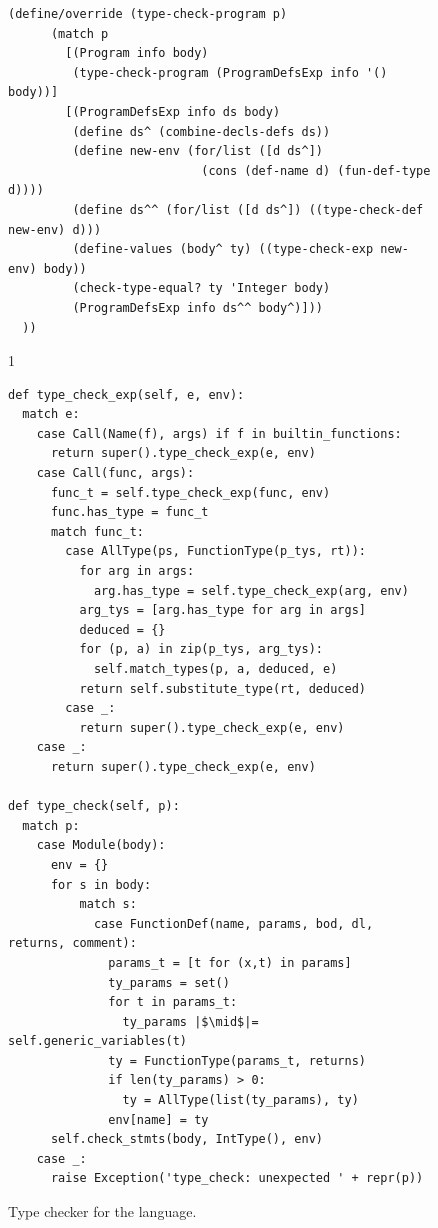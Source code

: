 \documentclass[7x10]{TimesAPriori_MIT}%
\def\pythonEd{1}
\providecommand{\BookEdition}{1}
\let\edition\BookEdition
\newcommand{\pythonColor}[0]{}
\numberwithin{theorem}{chapter}
\numberwithin{definition}{chapter}
\numberwithin{equation}{chapter}
\begin{document}
\begin{figure}[tbp]
\begin{tcolorbox}[colback=white]
{\begin{lstlisting}[basicstyle=\ttfamily\scriptsize]
    (define/override (type-check-program p)
      (match p
        [(Program info body)
         (type-check-program (ProgramDefsExp info '() body))]
        [(ProgramDefsExp info ds body)
         (define ds^ (combine-decls-defs ds))
         (define new-env (for/list ([d ds^])
                           (cons (def-name d) (fun-def-type d))))
         (define ds^^ (for/list ([d ds^]) ((type-check-def new-env) d)))
         (define-values (body^ ty) ((type-check-exp new-env) body))
         (check-type-equal? ty 'Integer body)
         (ProgramDefsExp info ds^^ body^)]))
  ))
\end{lstlisting}
\fi}
{\if\edition\pythonEd\pythonColor
\begin{lstlisting}[basicstyle=\ttfamily\small]
def type_check_exp(self, e, env):
  match e:
    case Call(Name(f), args) if f in builtin_functions:
      return super().type_check_exp(e, env)      
    case Call(func, args):
      func_t = self.type_check_exp(func, env)
      func.has_type = func_t
      match func_t:
        case AllType(ps, FunctionType(p_tys, rt)):
          for arg in args:
            arg.has_type = self.type_check_exp(arg, env)
          arg_tys = [arg.has_type for arg in args]
          deduced = {}
          for (p, a) in zip(p_tys, arg_tys):
            self.match_types(p, a, deduced, e)
          return self.substitute_type(rt, deduced)
        case _:
          return super().type_check_exp(e, env)
    case _:
      return super().type_check_exp(e, env)

def type_check(self, p):
  match p:
    case Module(body):
      env = {}
      for s in body:
          match s:
            case FunctionDef(name, params, bod, dl, returns, comment):
              params_t = [t for (x,t) in params]
              ty_params = set()
              for t in params_t:
                ty_params |$\mid$|= self.generic_variables(t)
              ty = FunctionType(params_t, returns)
              if len(ty_params) > 0:
                ty = AllType(list(ty_params), ty)
              env[name] = ty
      self.check_stmts(body, IntType(), env)
    case _:
      raise Exception('type_check: unexpected ' + repr(p))
\end{lstlisting}
\fi}
\end{tcolorbox}

\caption{Type checker for the \LangPoly{} language.}
\label{fig:type-check-Lpoly}
\end{figure}
\end{document}
